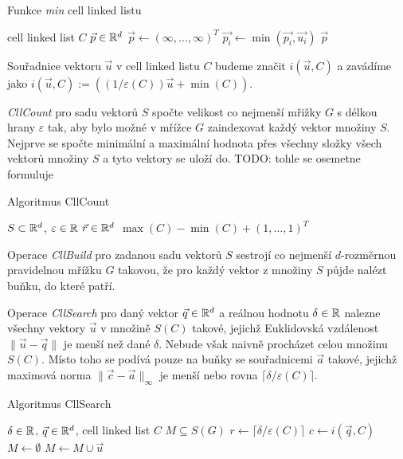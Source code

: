 \begin{algorithm}[!h]
  \caption{Funkce \textit{min} cell linked listu}
  \label{algo:min-cll}
  \begin{algorithmic}[1]
    \REQUIRE cell linked list $C$
    \ENSURE $\vec{p} \in \mathbb{R}^d$
    \STATE $\vec{p} \leftarrow (\infty, \ldots, \infty)^T$ \label{algo:min-cll:infty}
          \STATE $\vec{p_i} \leftarrow \min(\vec{p_i}, \vec{u_i})$ \label{algo:min-cll:minmax}
        \ENDFOR
    \ENDFOR
    \RETURN $\vec{p}$
  \end{algorithmic}
\end{algorithm}

Souřadnice vektoru $\vec{u}$ v cell linked listu $C$ budeme značit $i(\vec{u}, C)$ a zavádíme jako $i(\vec{u}, C) := ((1 / \varepsilon(C)) \vec{u} + \min(C))$.

\textit{CllCount} pro sadu vektorů $S$ spočte velikost co nejmenší mřižky $G$ s délkou hrany $\varepsilon$ tak, aby bylo možné v mřížce $G$ zaindexovat každý vektor množiny $S$. Nejprve se spočte minimální a maximální hodnota přes všechny složky všech vektorů množiny $S$ a tyto vektory se uloží do. TODO: tohle se osemetne formuluje

\begin{algorithm}[h!]
  \caption{Algoritmus CllCount}
  \label{algo:cll-count}
  \begin{algorithmic}
    \REQUIRE $S \subset \mathbb{R}^d$, $\varepsilon \in \mathbb{R}$
    \ENSURE $\vec{r} \in \mathbb{R}^d$
    \RETURN $\max(C) - \min(C) + (1, \ldots, 1)^T$
  \end{algorithmic}
\end{algorithm}

Operace \textit{CllBuild} pro zadanou sadu vektorů $S$ sestrojí co nejmenší $d$-rozměrnou pravidelnou mřížku $G$ takovou, že pro každý vektor z množiny $S$ půjde nalézt buňku, do které patří. 

Operace \textit{CllSearch} pro daný vektor $\vec{q} \in \mathbb{R}^d$ a reálnou hodnotu $\delta \in \mathbb{R}$ nalezne všechny vektory $\vec{u}$ v množině $S(C)$ takové, jejichž Euklidovská vzdálenost $\|\vec{u} - \vec{q}\|$ je menší než dané $\delta$. Nebude však naivně procházet celou množinu $S(C)$. Místo toho se podívá pouze na buňky se souřadnicemi $\vec{a}$ takové, jejichž maximová norma $\|\vec{c} - \vec{a}\|_\infty$ je menší nebo rovna $\lceil\delta / \varepsilon(C)\rceil$.

\begin{algorithm}[h!]
  \caption{Algoritmus CllSearch}
  \label{algo:cll-build}
  \begin{algorithmic}
    \REQUIRE $\delta \in \mathbb{R}$, $\vec{q} \in \mathbb{R}^d$, cell linked list $C$
    \ENSURE $M \subseteq S(G)$
    \STATE $r \leftarrow \lceil\delta / \varepsilon(C)\rceil$
    \STATE $c \leftarrow i(\vec{q}, C)$
    \STATE $M \leftarrow \emptyset$
        \STATE $M \leftarrow M \cup \vec{u}$
      \ENDFOR
    \ENDFOR
  \end{algorithmic}
\end{algorithm}

